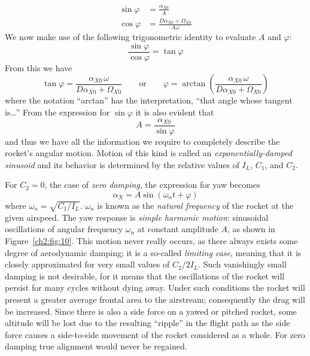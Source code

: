 \begin{align*}
\sin\varphi &= \frac{\alpha_{X0}}{A}\\
\cos\varphi &= \frac{D\alpha_{X0} + \Omega_{X0}}{A\omega}
\end{align*}
We now make use of the following trigonometric identity to evaluate $A$ and
$\varphi$:
\begin{equation*}
\frac{\sin\varphi}{\cos\varphi} = \tan\varphi
\end{equation*}
From this we have
\begin{equation}\label{ch2:eq:18}
\tan\varphi = \frac{\alpha_{X0}\,\omega}{D\alpha_{X0} + \Omega_{X0}}
\qquad \text{or} \qquad
\varphi = \arctan\left(\frac{\alpha_{X0}\,\omega}{D\alpha_{X0} + \Omega_{X0}}\right)
\end{equation}
where the notation ``arctan'' has the interpretation, ``that angle whose
tangent is\ldots'' From the expression for $\sin\varphi$ it is also evident
that
\begin{equation}\label{ch2:eq:19}
A = \frac{\alpha_{X0}}{\sin\varphi}
\end{equation}
and thus we have all the information we require to completely describe the
rocket's angular motion. Motion of this kind is called an
\emph{exponentially-damped sinusoid} and its behavior is determined by the
relative values of $I_L$, $C_1$, and $C_2$.

For $C_2 = 0$, the case of \emph{zero damping}, the expression for yaw becomes
\begin{equation*}
\alpha_X = A\sin(\omega_n t + \varphi)
\end{equation*}
where $\omega_n = \sqrt{C_1/I_L}$. $\omega_n$ is known as the \emph{natural
frequency} of the rocket at the given airspeed. The yaw response is
\emph{simple harmonic motion}: sinusoidal oscillations of angular frequency
$\omega_n$ at constant amplitude $A$, as shown in Figure~\ref{ch2:fig:10}. This
motion never really occurs, as there always exists some degree of aerodynamic
damping; it is a so-called \emph{limiting case}, meaning that it is closely
approximated for very small values of $C_2/2I_L$. Such vanishingly small
damping is not desirable, for it means that the oscillations of the rocket will
persist for many cycles without dying away. Under such conditions the rocket
will present a greater average frontal area to the airstream; consequently the
drag will be increased. Since there is also a side force on a yawed or pitched
rocket, some altitude will be lost due to the resulting ``ripple'' in the
flight path as the side force causes a side-to-side movement of the rocket
considered as a whole. For zero damping true alignment would never be regained.


